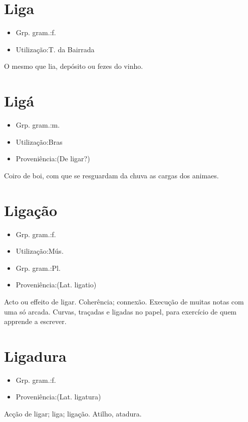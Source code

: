 \section{Liga}
\begin{itemize}
\item {Grp. gram.:f.}
\end{itemize}
\begin{itemize}
\item {Utilização:T. da Bairrada}
\end{itemize}
O mesmo que \textunderscore lia\textunderscore , depósito ou fezes do vinho.
\section{Ligá}
\begin{itemize}
\item {Grp. gram.:m.}
\end{itemize}
\begin{itemize}
\item {Utilização:Bras}
\end{itemize}
\begin{itemize}
\item {Proveniência:(De \textunderscore ligar\textunderscore ?)}
\end{itemize}
Coiro de boi, com que se resguardam da chuva as cargas dos animaes.
\section{Ligação}
\begin{itemize}
\item {Grp. gram.:f.}
\end{itemize}
\begin{itemize}
\item {Utilização:Mús.}
\end{itemize}
\begin{itemize}
\item {Grp. gram.:Pl.}
\end{itemize}
\begin{itemize}
\item {Proveniência:(Lat. \textunderscore ligatio\textunderscore )}
\end{itemize}
Acto ou effeito de ligar.
Coherência; connexão.
Execução de muitas notas com uma só arcada.
Curvas, traçadas e ligadas no papel, para exercício de quem apprende a escrever.
\section{Ligadura}
\begin{itemize}
\item {Grp. gram.:f.}
\end{itemize}
\begin{itemize}
\item {Proveniência:(Lat. \textunderscore ligatura\textunderscore )}
\end{itemize}
Acção de ligar; liga; ligação.
Atilho, atadura.
